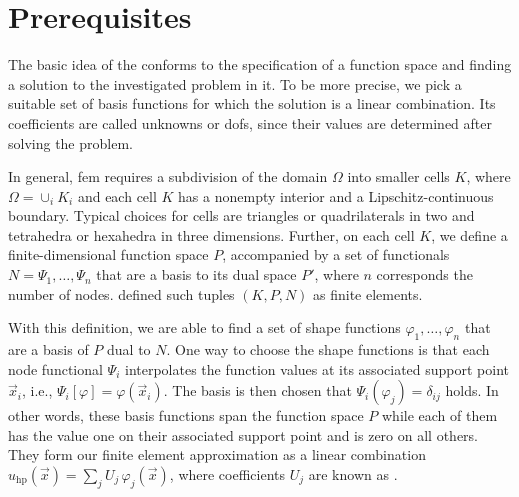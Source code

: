 \section{Prerequisites}
\label{sec:prerequisites}


The basic idea of the  conforms to the specification of a function space and finding a solution to the investigated problem in it. To be more precise, we pick a suitable set of basis functions for which the solution is a linear combination. Its coefficients are called unknowns or \glspl{dof}, since their values are determined after solving the problem.

In general, \gls{fem} requires a subdivision of the domain $\Omega$ into smaller cells $K$, where $\Omega = \cup_{i} K_i$ and each cell $K$ has a nonempty interior and a Lipschitz-continuous boundary. Typical choices for cells are triangles or quadrilaterals in two and tetrahedra or hexahedra in three dimensions.
Further, on each cell $K$, we define a finite-dimensional function space $P$, accompanied by a set of functionals $N = {\Psi_1, \dots, \Psi_n}$ that are a basis to its dual space $P'$, where $n$ corresponds the number of nodes. \textcite[Sec.~2.1]{ciarlet1978} defined such tuples $(K,P,N)$ as finite elements.

With this definition, we are able to find a set of shape functions ${\varphi_1, \dots, \varphi_n}$ that are a basis of $P$ dual to $N$.
One way to choose the shape functions is that each node functional $\Psi_i$ interpolates the function values at its associated support point $\vec{x}_i$, i.e., $\Psi_i[\varphi] = \varphi(\vec{x}_i)$. The basis is then chosen that $\Psi_i(\varphi_j) = \delta_{ij}$ holds.
In other words, these basis functions span the function space $P$ while each of them has the value one on their associated support point and is zero on all others. They form our finite element approximation as a linear combination $u_{\text{hp}}(\vec{x}) = \sum_{j} U_j \, \varphi_j(\vec{x})$, where coefficients $U_j$ are known as .


